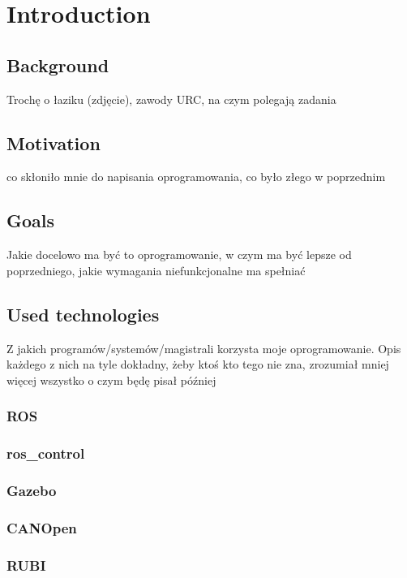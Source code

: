 \documentclass[english,inz,shortabstract]{iithesis}
\author         {Błażej Sowa}
\begin{document}
\chapter{Introduction}

\section{Background}
Trochę o łaziku (zdjęcie), zawody URC, na czym polegają zadania

\section{Motivation}
co skłoniło mnie do napisania oprogramowania, co było złego w poprzednim

\section{Goals}
Jakie docelowo ma być to oprogramowanie, w czym ma być lepsze od poprzedniego, jakie wymagania niefunkcjonalne ma spełniać

\section{Used technologies} %
Z jakich programów/systemów/magistrali korzysta moje oprogramowanie. Opis każdego z nich na tyle dokładny, żeby ktoś kto tego nie zna, zrozumiał mniej więcej wszystko o czym będę pisał później

    \subsection{ROS}

    \subsection{ros\_control}

    \subsection{Gazebo}

    \subsection{CANOpen}

    \subsection{RUBI}
\end{document}
